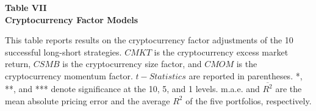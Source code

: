 \documentclass{article}
\begin{document}
    \begin{center}
        \textbf{
        Table VII
        \\
        Cryptocurrency Factor Models
        }
    \end{center}
    \begin{justify}
        \footnotesize{
            This table reports results on the cryptocurrency factor adjustments of the 10 successful long-short strategies. $CMKT$ is the cryptocurrency excess market return, $CSMB$ is the cryptocurrency size factor, and $CMOM$ is the cryptocurrency momentum factor. $t-Statistics$ are reported in parentheses. *, **, and *** denote significance at the 10, 5, and 1 levels. m.a.e. and $\overline{R^2}$ are the mean absolute pricing error and the average $R^2$ of the five portfolios, respectively.
        }
    \end{justify}
    \-
\end{document}

